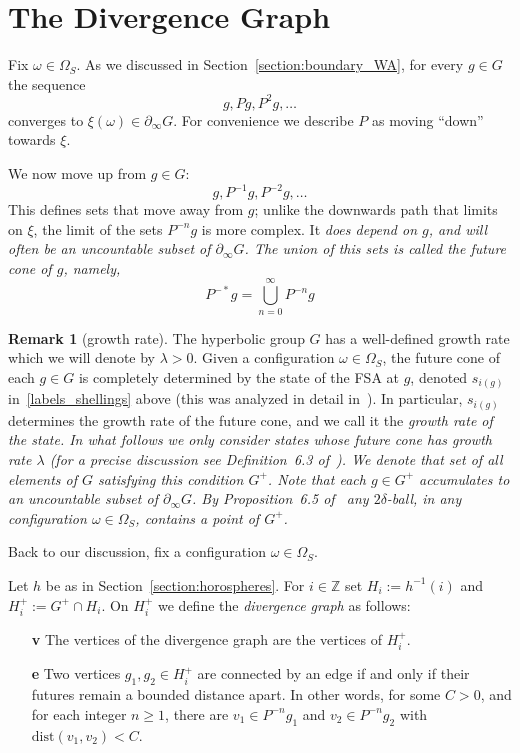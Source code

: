 \documentclass[12pt,reqno]{amsart}
\theoremstyle{plain}
\theoremstyle{definition}
\numberwithin{subcase}{case}
\theoremstyle{plain}
\theoremstyle{definition}
\newtheorem{remark}[thm]{Remark}
\begin{document}
\section{The Divergence Graph}

Fix \(\omega \in \Omega_{S}\).
As we discussed in Section~\ref{section:boundary_WA}, for every \(g \in G\) the sequence 
\begin{equation}
\label{past_geodesic}
g, Pg, P^{2}g,\dots
\end{equation}
converges to \(\xi(\omega) \in \partial_{\infty} G\). 
For convenience we describe \(P\) as moving ``down'' towards \(\xi\).

We now move up from  \(g \in G\):
\[
g, P^{-1}g, P^{-2}g,\dots
\]
This defines sets that move away from \(g\); unlike the downwards path that limits on \(\xi\), the limit of the sets \(P^{-n}g\) is more complex. It \em does \em depend on \(g\), and will often be an uncountable subset of \(\partial_{\infty} G\).  The union of this sets is called the {\it future cone} of \(g\), namely,
\[
P^{-*}g = \bigcup_{n=0}^{\infty} P^{-n}g
\]
\begin{remark}[growth rate]
\label{remark:growth_rate}
The hyperbolic group \(G\) has a well-defined growth rate which we will denote by \(\lambda > 0\).  Given a configuration \(\omega \in \Omega_{S}\), the future cone of each \(g \in G\) is completely determined by the state of the FSA at \(g\), denoted \(s_{i(g)}\) in~\eqref{labels_shellings} above (this was analyzed in detail in~\cite{MR4015648}). In particular, \(s_{i(g)}\) determines the growth rate of the future cone, and we call it the \em growth rate of the state\em. In what follows we only consider states whose future cone has growth rate \(\lambda\) (for a precise discussion see Definition~6.3 of~\cite{cohen_goodman-strauss_rieck_2021}).  We denote that set of all elements of \(G\) satisfying this condition \(G^{+}\). 
Note that each \(g \in G^{+}\) accumulates to an uncountable subset of \(\partial_{\infty} G\). 
By Proposition~6.5 of~\cite{cohen_goodman-strauss_rieck_2021} any \(2\delta\)-ball, in any configuration \(\omega \in \Omega_{S}\), contains a point of \(G^{+}\). 
\end{remark}

Back to our discussion, fix a configuration \(\omega \in \Omega_{S}\).  

Let  \(h\) be as in Section~\ref{section:horospheres}.
For \(i \in \mathbb{Z}\) set \(H_{i} := h^{-1}(i)\) and \(H^{+}_{i} := G^{+} \cap H_{i}\).  On \(H^{+}_{i}\) we define the {\it divergence graph} as follows:
\begin{enumerate}
\item[\bf v] The vertices of the divergence graph are the vertices of \(H^{+}_{i}\).
\item[\bf e] Two vertices \(g_{1}, g_{2} \in H^{+}_{i}\) are connected by an edge if and only if their futures remain a bounded distance apart. In other words, for some \(C>0\), and for each integer \(n \geq 1\), there are \(v_{1} \in P^{-n}g_{1}\) and \(v_{2} \in P^{-n}g_{2}\) with \(\mathrm{dist}(v_{1},v_{2}) < C\). 
\end{enumerate}
\end{document}
